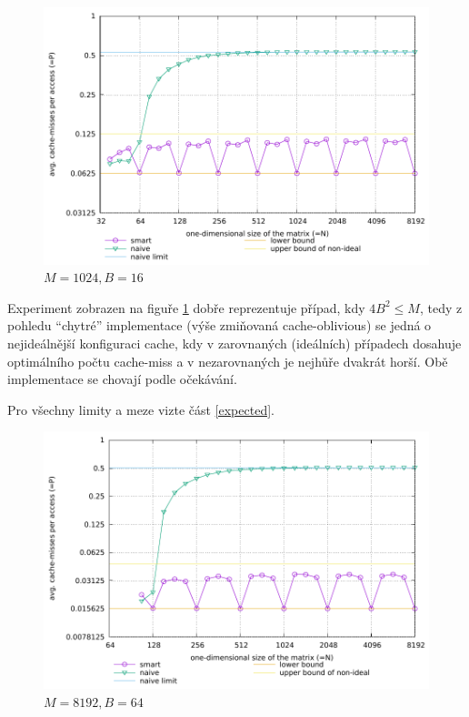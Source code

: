 \documentclass[a4paper,12pt]{article} %
\begin{document}
\begin{figure}[!htb]
	\caption{$M = 1024, B = 16$}
	\label{m1024b16}
	\includegraphics{sim-m1024-b16.pdf}
\end{figure}

Experiment zobrazen na figuře \ref{m1024b16} dobře reprezentuje případ, kdy $4B^2 \leq M$, tedy z pohledu ``chytré'' implementace (výše zmiňovaná cache-oblivious) se jedná o nejideálnější konfiguraci cache, kdy v zarovnaných (ideálních) případech dosahuje optimálního počtu cache-miss a v nezarovnaných je nejhůře dvakrát horší. Obě implementace se chovají podle očekávání.

Pro všechny limity a meze vizte část \ref{expected}.

\pagebreak

\begin{figure}[!hbt]
	\caption{$M = 8192, B = 64$}
	\label{m8192b64}
	\includegraphics{sim-m8192-b64.pdf}
\end{figure}
\end{document}
